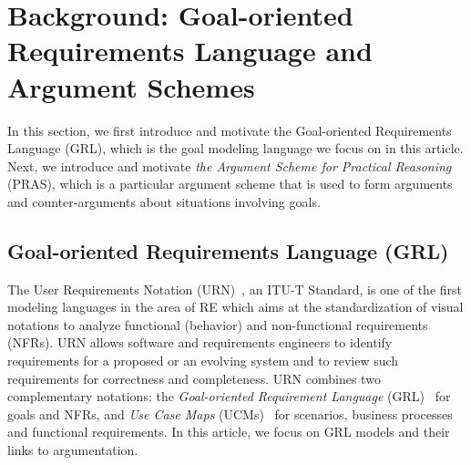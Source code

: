 \section{Background: Goal-oriented Requirements Language and Argument Schemes}
\label{sect:background}

In this section, we first introduce and motivate the Goal-oriented Requirements Language (GRL), which is the goal modeling language we focus on in this article. Next, we introduce and motivate \emph{the Argument Scheme for Practical Reasoning} (PRAS), which is a particular argument scheme that is used to form arguments and counter-arguments about situations involving goals.

\subsection{Goal-oriented Requirements Language (GRL)}
\label{sect:background:grl}
The User Requirements Notation (URN)~\cite{URN}, an ITU-T Standard, is one of the first modeling languages in the area of RE which aims at the standardization of visual notations to analyze functional (behavior) and non-functional requirements (NFRs). %
URN allows software and requirements engineers to identify requirements for a proposed or an evolving system and to review such requirements for correctness and completeness. URN combines two complementary notations: the \emph{Goal-oriented Requirement Language} (GRL)~\cite{Amyot:2010:EGM:1841349.1841356} for goals and NFRs, and \emph{Use Case Maps} (UCMs)~\cite{Weiss05designing} for scenarios, business processes and functional requirements. In this article, we focus on GRL models and their links to argumentation.  

